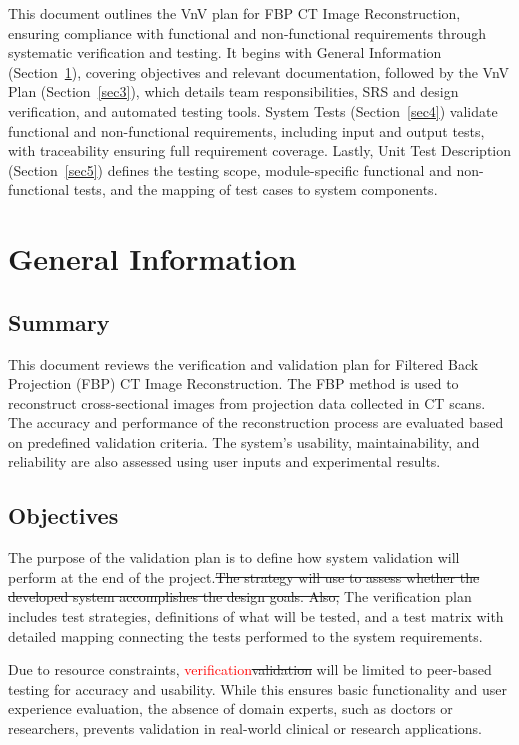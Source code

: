 \documentclass[12pt, titlepage]{article}
\newcommand{\add}{\textcolor{red}}
\begin{document}
\newpage


This document outlines the VnV plan for FBP CT Image Reconstruction, ensuring compliance with
functional and non-functional requirements through systematic verification and
testing. It begins with General Information (Section~\ref{sec2}), covering objectives and
relevant documentation, followed by the VnV Plan (Section~\ref{sec3}), which details team
responsibilities, SRS and design verification, and automated testing tools.
System Tests (Section~\ref{sec4}) validate functional and non-functional requirements,
including input and output tests, with traceability ensuring full requirement
coverage. Lastly, Unit Test Description (Section~\ref{sec5}) defines the testing scope,
module-specific functional and non-functional tests, and the mapping of test
cases to system components.

\section{General Information} \label{sec2}

\subsection{Summary}
This document reviews the verification and validation plan for Filtered Back
Projection (FBP) CT Image Reconstruction. The FBP method is used to reconstruct
cross-sectional images from projection data collected in CT scans. The accuracy
and performance of the reconstruction process are evaluated based on predefined
validation criteria. The system’s usability, maintainability, and reliability
are also assessed using user inputs and experimental results.

\subsection{Objectives}
The purpose of the validation plan is to define how system validation will
perform at the end of the project.\st{The strategy will use to assess whether the
developed system accomplishes the design goals. Also, } The verification plan
includes test strategies, definitions of what will be tested, and a test matrix
with detailed mapping connecting the tests performed to the system
requirements.

Due to resource constraints, \add{verification}\st{validation} will be limited to
peer-based testing for accuracy and usability. While this ensures basic
functionality and user experience evaluation, the absence of domain experts,
such as doctors or researchers, prevents validation in real-world clinical or
research applications.
\end{document}
